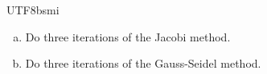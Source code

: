 \documentclass[12pt,a4paper]{article}
\begin{document}
\begin{CJK*}{UTF8}{bsmi}
\begin{enumerate}[(a)]
    \item Do three iterations of the Jacobi method.
    \item Do three iterations of the Gauss-Seidel method.
\end{enumerate}

\end{CJK*}
\end{document}
